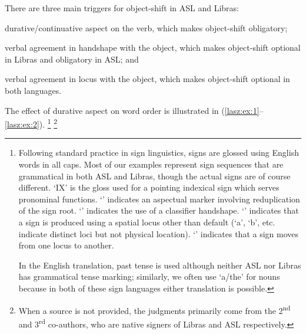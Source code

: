 \documentclass[output=paper]{langscibook}
\begin{document}
There are three main triggers for object-shift in ASL and
Libras: 
\begin{inparaenum}[1.]
    \item durative\slash continuative aspect on the verb, which makes object-shift obligatory; 
    \item verbal agreement in handshape with the object, which makes object-shift 
    optional in Libras and obligatory in ASL; and 
    \item verbal agreement in locus with the object, which makes object-shift optional in both languages. 
\end{inparaenum}
The effect of durative aspect on word order is illustrated in (\ref{lasz:ex:1}--\ref{lasz:ex:2}).%
\footnote{%
    Following standard practice in sign linguistics, signs are glossed using
    English words in all caps. Most of our examples represent sign sequences that are
    grammatical in both ASL and Libras, though the actual signs are of course different.
    `IX' is the gloss used for a pointing indexical sign which serves
    pronominal functions. `\laszAsp{}' indicates an aspectual marker involving reduplication
    of the sign root. `\laszHs{\_}' indicates the use of a classifier handshape. `\laszLoc{\_}'
    indicates that a sign is produced using a spatial locus other than default (`a', `b',
    etc. indicate distinct loci but not physical location). `\laszDir{\_}{\_}' indicates that a sign
    moves from one locus to another. \par 
    In the English translation, past tense is used although neither ASL nor
    Libras has grammatical tense marking; similarly, we often use `a/the' for nouns
    because in both of these sign languages either translation is possible.
}%
\footnote{When a source is not provided, the judgments primarily come from the
    2\textsuperscript{nd} and 3\textsuperscript{rd} co-authors, who are native signers of Libras and ASL respectively.
}
\ea
    \label{lasz:ex:1}
    \z 
\ex
    \label{lasz:ex:2}
\end{document}

